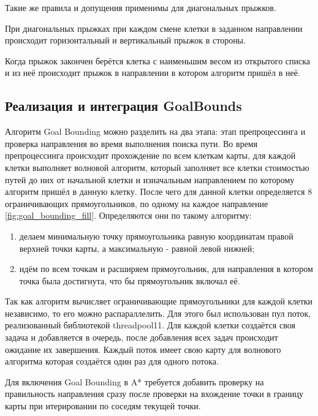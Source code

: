 Такие же правила и допущения применимы для диагональных прыжков.

При диагональных прыжках при каждом смене клетки в заданном направлении происходит горизонтальный и вертикальный прыжок в стороны.

Когда прыжок закончен берётся клетка с наименьшим весом из открытого списка и из неё происходит прыжок в направлении в котором алгоритм пришёл в неё.

\subsection{Реализация и интеграция GoalBounds}

Алгоритм Goal Bounding можно разделить на два этапа: этап препроцессинга и проверка направления во время выполнения поиска пути. Во время препроцессинга происходит прохождение по всем клеткам карты, для каждой клетки выполняет волновой алгоритм, который заполняет все клетки стоимостью путей до них от начальной клетки и изначальным направлением по которому алгоритм пришёл в данную клетку. После чего для данной клетки определяется 8 ограничивающих прямоугольников, по одному на каждое направление \cref{fig:goal_bounding_fill}. Определяются они по такому алгоритму: 

\begin{enumerate}
	\item делаем минимальную точку прямоугольника равную координатам правой верхней точки карты, а максимальную - равной левой нижней;
	\item идём по всем точкам и расширяем прямоугольник, для направления в котором точка была достигнута, что бы прямоугольник включал её. 
\end{enumerate}


Так как алгоритм вычисляет ограничивающие прямоугольники для каждой клетки независимо, то его можно распараллелить. Для этого был использован пул поток, реализованный библиотекой threadpool11. Для каждой клетки создаётся своя задача и добавляется в очередь, после добавления всех задач происходит ожидание их завершения. Каждый поток имеет свою карту для волнового алгоритма которая создаётся один раз для одного потока.

Для включения Goal Bounding в A* требуется добавить проверку на правильность направления сразу после проверки на вхождение точки в границу карты при итерировании по соседям текущей точки. 

